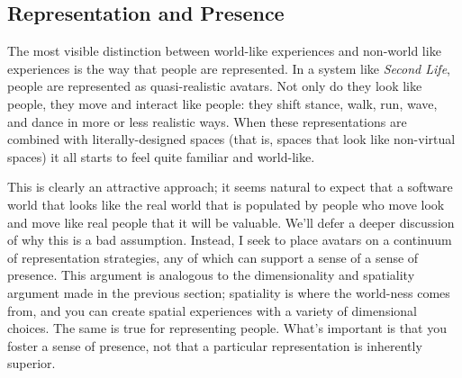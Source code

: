 
\subsection{Representation and Presence}


The most visible distinction between world-like experiences and non-world like experiences is the way that people are represented. In a system like \emph{Second Life}, people are represented as quasi-realistic avatars. Not only do they look like people, they move and interact like people: they shift stance, walk, run, wave, and dance in more or less realistic ways. When these representations are combined with literally-designed spaces (that is, spaces that look like non-virtual spaces) it all starts to feel quite familiar and world-like.

This is clearly an attractive approach; it seems natural to expect that a software world that looks like the real world that is populated by people who move look and move like real people that it will be valuable. We'll defer a deeper discussion of why this is a bad assumption. Instead, I seek to place avatars on a continuum of representation strategies, any of which can support a sense of a sense of presence. This argument is analogous to the dimensionality and spatiality argument made in the previous section; spatiality is where the world-ness comes from, and you can create spatial experiences with a variety of dimensional choices. The same is true for representing people. What's important is that you foster a sense of presence, not that a particular representation is inherently superior.



%
%



